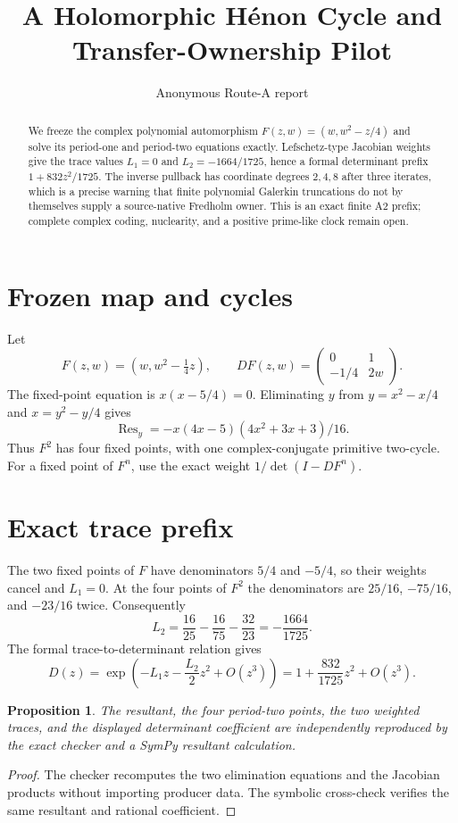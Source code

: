 \documentclass[10pt]{article}
\title{A Holomorphic H\'enon Cycle and Transfer-Ownership Pilot}
\author{Anonymous Route-A report}
\date{}
\newtheorem{proposition}{Proposition}
\begin{document}
\maketitle
\begin{abstract}
We freeze the complex polynomial automorphism
$F(z,w)=(w,w^2-z/4)$ and solve its period-one and period-two equations
exactly.  Lefschetz-type Jacobian weights give the trace values
$L_1=0$ and $L_2=-1664/1725$, hence a formal determinant prefix
$1+832z^2/1725$.  The inverse pullback has coordinate degrees $2,4,8$
after three iterates, which is a precise warning that finite polynomial
Galerkin truncations do not by themselves supply a source-native Fredholm
owner.  This is an exact finite A2 prefix; complete complex coding,
nuclearity, and a positive prime-like clock remain open.
\end{abstract}

\section{Frozen map and cycles}
Let
\[
F(z,w)=(w,w^2-\tfrac14z),
\qquad
DF(z,w)=\begin{pmatrix}0&1\\-1/4&2w\end{pmatrix}.
\]
The fixed-point equation is $x(x-5/4)=0$.  Eliminating $y$ from
$y=x^2-x/4$ and $x=y^2-y/4$ gives
\[
\operatorname{Res}_y= -x(4x-5)(4x^2+3x+3)/16.
\]
Thus $F^2$ has four fixed points, with one complex-conjugate primitive
two-cycle.  For a fixed point of $F^n$, use the exact weight
$1/\det(I-DF^n)$.

\section{Exact trace prefix}
The two fixed points of $F$ have denominators $5/4$ and $-5/4$, so their
weights cancel and $L_1=0$.  At the four points of $F^2$ the denominators
are $25/16$, $-75/16$, and $-23/16$ twice.  Consequently
\[
L_2=\frac{16}{25}-\frac{16}{75}-\frac{32}{23}=-\frac{1664}{1725}.
\]
The formal trace-to-determinant relation gives
\[
D(z)=\exp\left(-L_1z-\frac{L_2}{2}z^2+O(z^3)\right)
 =1+\frac{832}{1725}z^2+O(z^3).
\]

\begin{proposition}
The resultant, the four period-two points, the two weighted traces, and the
displayed determinant coefficient are independently reproduced by the exact
checker and a SymPy resultant calculation.
\end{proposition}
\begin{proof}
The checker recomputes the two elimination equations and the Jacobian products
without importing producer data.  The symbolic cross-check verifies the same
resultant and rational coefficient.
\end{proof}
\end{document}
